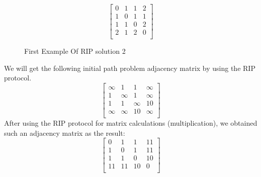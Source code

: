 \documentclass[a4paper,12pt,twoside,openright]{report}
\begin{document}
\[
\begin{bmatrix}
    0 & 1 & 1 & 2 \\
    1 & 0 & 1 & 1 \\
    1 & 1 & 0 & 2 \\
    2 & 1 & 2 & 0 \\
\end{bmatrix}
\]
\begin{figure}[H]
\centering
{}
\label{example:rip:2}
\caption{First Example Of RIP solution 2}
\end{figure}
We will get the following initial path problem adjacency matrix by using the RIP protocol.
\[
\begin{bmatrix}
    \infty & 1 & 1 & \infty \\
    1 & \infty & 1 & \infty \\
    1 & 1 & \infty & 10 \\
    \infty & \infty & 10 & \infty \\
\end{bmatrix}
\]
After using the RIP protocol for matrix calculations (multiplication), we obtained such an adjacency matrix as the result:
\[
\begin{bmatrix}
    0 & 1 & 1 & 11 \\
    1 & 0 & 1 & 11 \\
    1 & 1 & 0 & 10 \\
    11 & 11 & 10 & 0 \\
\end{bmatrix}
\]
\end{document}
